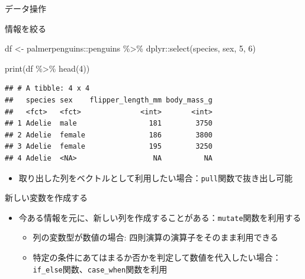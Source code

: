 \documentclass[
  ignorenonframetext,
]{beamer}
\newenvironment{Shaded}{\begin{snugshade}}{\end{snugshade}}
\newcommand{\DecValTok}[1]{\textcolor[rgb]{0.00,0.00,0.81}{#1}}
\newcommand{\FunctionTok}[1]{\textcolor[rgb]{0.00,0.00,0.00}{#1}}
\newcommand{\NormalTok}[1]{#1}
\newcommand{\OtherTok}[1]{\textcolor[rgb]{0.56,0.35,0.01}{#1}}
\newcommand{\SpecialCharTok}[1]{\textcolor[rgb]{0.00,0.00,0.00}{#1}}
\providecommand{\tightlist}{%
  \setlength{\itemsep}{0pt}\setlength{\parskip}{0pt}}
\begin{document}
\begin{frame}[fragile]{データ操作}
\begin{block}{情報を絞る}
\begin{Shaded}
\begin{Highlighting}[]
\NormalTok{df }\OtherTok{\textless{}{-}}\NormalTok{ palmerpenguins}\SpecialCharTok{::}\NormalTok{penguins }\SpecialCharTok{\%\textgreater{}\%}
\NormalTok{  dplyr}\SpecialCharTok{::}\FunctionTok{select}\NormalTok{(species, sex, }\DecValTok{5}\NormalTok{, }\DecValTok{6}\NormalTok{)}

\FunctionTok{print}\NormalTok{(df }\SpecialCharTok{\%\textgreater{}\%} \FunctionTok{head}\NormalTok{(}\DecValTok{4}\NormalTok{))}
\end{Highlighting}
\end{Shaded}

\begin{verbatim}
## # A tibble: 4 x 4
##   species sex    flipper_length_mm body_mass_g
##   <fct>   <fct>              <int>       <int>
## 1 Adelie  male                 181        3750
## 2 Adelie  female               186        3800
## 3 Adelie  female               195        3250
## 4 Adelie  <NA>                  NA          NA
\end{verbatim}

\begin{itemize}
\tightlist
\item
  取り出した列をベクトルとして利用したい場合：\texttt{pull}関数で抜き出し可能
\end{itemize}
\end{block}

\begin{block}{新しい変数を作成する}
\protect\hypertarget{ux65b0ux3057ux3044ux5909ux6570ux3092ux4f5cux6210ux3059ux308b}{}
\begin{itemize}
\tightlist
\item
  今ある情報を元に、新しい列を作成することがある：\texttt{mutate}関数を利用する

  \begin{itemize}
  \tightlist
  \item
    列の変数型が数値の場合: 四則演算の演算子をそのまま利用できる
  \item
    特定の条件にあてはまるか否かを判定して数値を代入したい場合：\texttt{if\_else}関数、\texttt{case\_when}関数を利用
  \end{itemize}
\end{itemize}


\end{block}
\end{frame}
\end{document}
